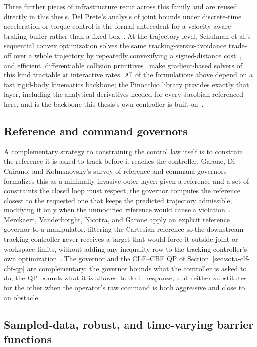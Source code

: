 \documentclass[12pt,a4paper,twoside,openright]{report}
\begin{document}
Three further pieces of infrastructure recur across this family and are reused directly in this thesis. Del Prete's analysis of joint bounds under discrete-time acceleration or torque control is the formal antecedent for a velocity-aware braking buffer rather than a fixed box~\cite{delprete2018joint}. At the trajectory level, Schulman et al.'s sequential convex optimization solves the same tracking-versus-avoidance trade-off over a whole trajectory by repeatedly convexifying a signed-distance cost~\cite{schulman2014trajopt}, and efficient, differentiable collision primitives~\cite{tracy2022diffpills,montaut2023diffcol} make gradient-based solvers of this kind tractable at interactive rates. All of the formulations above depend on a fast rigid-body kinematics backbone; the Pinocchio library provides exactly that layer, including the analytical derivatives needed for every Jacobian referenced here, and is the backbone this thesis's own controller is built on~\cite{carpentier2019}.

\subsection{Reference and command governors}
\label{sec:sota-governors}

A complementary strategy to constraining the control law itself is to constrain the reference it is asked to track before it reaches the controller. Garone, Di Cairano, and Kolmanovsky's survey of reference and command governors formalizes this as a minimally invasive outer layer: given a reference and a set of constraints the closed loop must respect, the governor computes the reference closest to the requested one that keeps the predicted trajectory admissible, modifying it only when the unmodified reference would cause a violation~\cite{garone2017}. Merckaert, Vanderborght, Nicotra, and Garone apply an explicit reference governor to a manipulator, filtering the Cartesian reference so the downstream tracking controller never receives a target that would force it outside joint or workspace limits, without adding any inequality row to the tracking controller's own optimization~\cite{merckaert2018constrained}. The governor and the CLF--CBF QP of Section~\ref{sec:sota-clf-cbf-qp} are complementary: the governor bounds what the controller is asked to do, the QP bounds what it is allowed to do in response, and neither substitutes for the other when the operator's raw command is both aggressive and close to an obstacle.

\subsection{Sampled-data, robust, and time-varying barrier functions}
\label{sec:sota-sampled-cbf}
\end{document}
